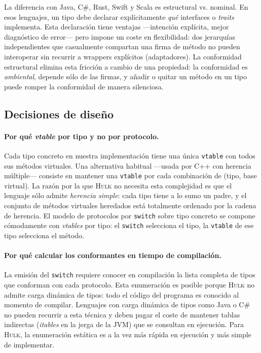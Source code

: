 \documentclass[11pt,a4paper,oneside,openany]{report}
\newcommand{\hulk}{\textsc{Hulk}}
\newcommand{\code}[1]{\texttt{#1}}
\begin{document}
La diferencia con Java, C\#, Rust, Swift y Scala es estructural vs. nominal.
En esos lenguajes, un tipo debe declarar explícitamente \emph{qué}
interfaces o \emph{traits} implementa. Esta declaración tiene ventajas
---intención explícita, mejor diagnóstico de error--- pero impone un coste
en flexibilidad: dos jerarquías independientes que casualmente compartan
una firma de método no pueden interoperar sin recurrir a wrappers
explícitos (adaptadores). La conformidad estructural elimina esta fricción
a cambio de una propiedad: la conformidad es \emph{ambiental}, depende sólo
de las firmas, y añadir o quitar un método en un tipo puede romper la
conformidad de manera silenciosa.

\subsection{Decisiones de diseño}

\paragraph{Por qué \emph{vtable} por tipo y no por protocolo.}
Cada tipo concreto en nuestra implementación tiene una única \code{vtable}
con todos sus métodos virtuales. Una alternativa habitual ---usada por C++
con herencia múltiple--- consiste en mantener una \code{vtable} por cada
combinación de (tipo, base virtual). La razón por la que \hulk{} no
necesita esta complejidad es que el lenguaje sólo admite \emph{herencia
simple}: cada tipo tiene a lo sumo un padre, y el conjunto de métodos
virtuales heredados está totalmente ordenado por la cadena de herencia. El
modelo de protocolos por \code{switch} sobre tipo concreto se compone
cómodamente con \emph{vtables} por tipo: el \code{switch} selecciona el
tipo, la \code{vtable} de ese tipo selecciona el método.

\paragraph{Por qué calcular los conformantes en tiempo de compilación.}
La emisión del \code{switch} requiere conocer en compilación la lista
completa de tipos que conforman con cada protocolo. Esta enumeración es
posible porque \hulk{} no admite carga dinámica de tipos: todo el código del
programa es conocido al momento de compilar. Lenguajes con carga dinámica
de tipos como Java o C\# no pueden recurrir a esta técnica y deben pagar el
coste de mantener tablas indirectas (\emph{itables} en la jerga de la JVM)
que se consultan en ejecución. Para \hulk{}, la enumeración estática es a
la vez más rápida en ejecución y más simple de implementar.
\end{document}
